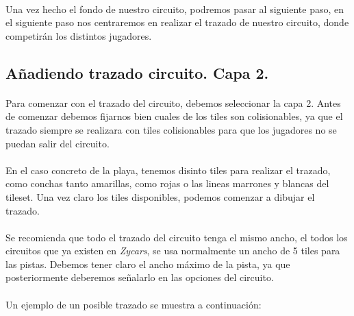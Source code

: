 \paragraph{}
Una vez hecho el fondo de nuestro circuito, podremos pasar al siguiente paso, en el siguiente paso nos centraremos en realizar el 
trazado de nuestro circuito, donde competirán los distintos jugadores.

\subsection{Añadiendo trazado circuito. Capa 2.}

\paragraph{}
Para comenzar con el trazado del circuito, debemos seleccionar la capa 2. Antes de comenzar debemos fijarnos bien cuales de los 
tiles son colisionables, ya que el trazado siempre se realizara con tiles colisionables para que los jugadores no se puedan salir
del circuito.

\paragraph{}
En el caso concreto de la playa, tenemos disinto tiles para realizar el trazado, como conchas tanto amarillas, como rojas o las 
lineas marrones y blancas del tileset. Una vez claro los tiles disponibles, podemos comenzar a dibujar el trazado.

\paragraph{}
Se recomienda que todo el trazado del circuito tenga el mismo ancho, el todos los circuitos que ya existen en \emph{Zycars}, se usa
normalmente un ancho de 5 tiles para las pistas. Debemos tener claro el ancho máximo de la pista, ya que posteriormente deberemos
señalarlo en las opciones del circuito.


\paragraph{}
Un ejemplo de un posible trazado se muestra a continuación:

